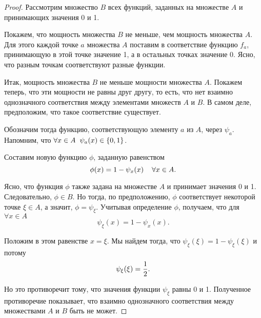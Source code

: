 \documentclass{article}
\begin{document}
\begin{proof}
Рассмотрим множество \(B\) всех функций, заданных на множестве \(A\) и принимающих значения 0 и 1.

Покажем, что мощность множества \(B\) не меньше, чем мощность множества \(A\). Для этого каждой точке \(a\) множества \(A\) поставим в соответствие функцию \(f_a\), принимающую в этой точке значение 1, а в остальных точках значение 0. Ясно, что разным точкам соответствуют разные функции.

Итак, мощность множества \(B\) не меньше мощности множества \(A\). Покажем теперь, что эти мощности не равны друг другу, то есть, что нет взаимно однозначного соответствия между элементами множеств \(A\) и \(B\). В самом деле, предположим, что такое соответствие существует.

Обозначим тогда функцию, соответствующую элементу \(a\) из \(A\), через \(\psi_a\). Напомним, что \(\forall x \in A \hspace{2mm} \psi_a(x) \in \{0, 1\}\).

Составим новую функцию \(\phi\), заданную равенством
\[
\phi(x) = 1 - \psi_x(x) \hspace{4mm} \forall x \in A.
\]

Ясно, что функция \(\phi\) также задана на множестве \(A\) и принимает значения 0 и 1. Следовательно, \(\phi \in B\). Но тогда, по предположению, \(\phi\) соответствует некоторой точке \(\xi \in A\), а значит, \(\phi = \psi_\xi\). Учитывая определение \(\phi\), получаем, что для \(\forall x \in A\)
\[
\psi_\xi(x) = 1 - \psi_x(x).
\]

Положим в этом равенстве \(x = \xi\). Мы найдем тогда, что \(\psi_\xi(\xi) = 1 - \psi_\xi(\xi)\) и потому
\[
\psi_\xi(\xi) = {1 \over 2}.
\]

Но это противоречит тому, что значения функции \(\psi_\xi\) равны 0 и 1. Полученное противоречие показывает, что взаимно однозначного соответствия между множествами \(A\) и \(B\) быть не может.
\end{proof}
\end{document}
